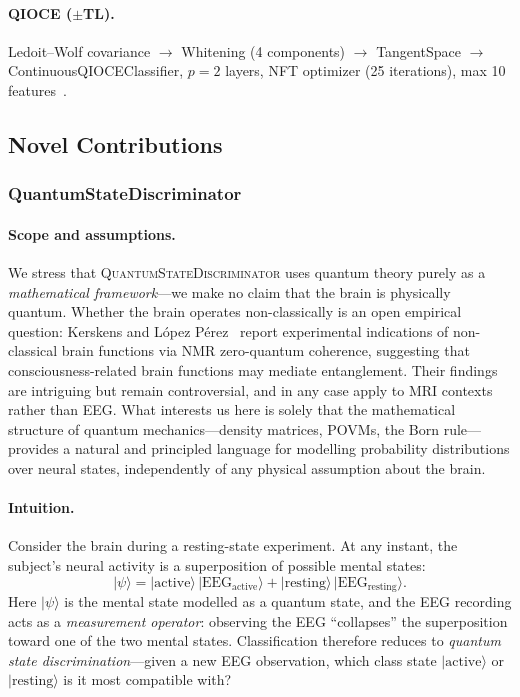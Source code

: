 \documentclass{article}
\begin{document}
\paragraph{QIOCE ($\pm$TL).}
Ledoit--Wolf covariance $\rightarrow$ Whitening (4 components) $\rightarrow$
TangentSpace $\rightarrow$ ContinuousQIOCEClassifier, $p=2$ layers, NFT
optimizer (25 iterations), max 10 features~\cite{qioce2023}.

\subsection{Novel Contributions}
\label{sec:novel}

\subsubsection{QuantumStateDiscriminator}

\paragraph{Scope and assumptions.}
We stress that \textsc{QuantumStateDiscriminator} uses quantum theory purely
as a \emph{mathematical framework}---we make no claim that the brain is
physically quantum.  Whether the brain operates non-classically is an open
empirical question: Kerskens and L\'opez P\'erez~\cite{kerskens2022nonclassical}
report experimental indications of non-classical brain functions via NMR
zero-quantum coherence, suggesting that consciousness-related brain functions
may mediate entanglement.  Their findings are intriguing but remain
controversial, and in any case apply to MRI contexts rather than EEG\@.
What interests us here is solely that the mathematical structure of quantum
mechanics---density matrices, POVMs, the Born rule---provides a natural and
principled language for modelling probability distributions over neural
states, independently of any physical assumption about the brain.

\paragraph{Intuition.}
Consider the brain during a resting-state experiment.  At any instant, the
subject's neural activity is a superposition of possible mental states:
\begin{equation}
  |\psi\rangle = |\text{active}\rangle\,|\text{EEG}_{\text{active}}\rangle
               + |\text{resting}\rangle\,|\text{EEG}_{\text{resting}}\rangle.
  \label{eq:mental_state}
\end{equation}
Here $|\psi\rangle$ is the mental state modelled as a quantum state, and the
EEG recording acts as a \emph{measurement operator}: observing the EEG
``collapses'' the superposition toward one of the two mental states.
Classification therefore reduces to \emph{quantum state discrimination}---given
a new EEG observation, which class state $|\text{active}\rangle$ or
$|\text{resting}\rangle$ is it most compatible with?
\end{document}
